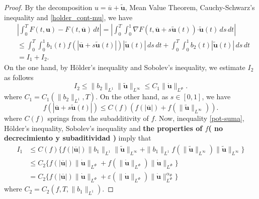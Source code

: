 \documentclass[twoside]{article}
\theoremstyle{remark}
\newcommand{\orlnor}{\|_{L^{\Phi}}}
\renewcommand{\b}[1]{\boldsymbol{#1}}
\newcommand{\ccdot}{\b{\cdot}}
\renewcommand{\leq}{\leqslant}
\begin{document}
\begin{proof}
By the decomposition $u=\overline{u}+\b{\tilde{u}}$,  Mean Value Theorem, Cauchy-Schwarz's inequality 
and \eqref{holder_cont-mu}, we have
\begin{equation}\label{cota-diferencia-F}
\begin{split}
&\left|\int_0^T F(t,\b{u})-F(t,\b{\overline{u}})\,dt\right|=
\left|\int_0^T \int_0^1 \nabla F(t,\b{\overline{u}}+s\b{\tilde{u}}(t))\ccdot \b{\tilde{u}}(t) \,ds \,dt\right|
\\
&\leq \int_0^T \int_0^1 b_1(t)f(|\b{\overline{u}}+s\b{\tilde{u}}(t)|)|\b{\tilde{u}}(t)|\,ds\,dt+
\int_0^T \int_0^1 b_2(t)|\b{\tilde{u}}(t)|\,ds\,dt
\\
&=I_1+I_2.
\end{split}
\end{equation}
On the one hand, by H\"older's inequality and Sobolev's inequality, we estimate $I_2$ as follows
\begin{equation}\label{cota-i2}
I_2\leq \|b_2\|_{L^1} \|\b{\tilde{u}}\|_{L^{\infty}}\leq
C_1\|\b{\dot u}\orlnor.
\end{equation}
 where $C_1=C_1(\|b_2\|_{L^1}, T)$. On the other hand, as $s\in [0,1]$, we have
\begin{equation}\label{pot-suma}
f(|\b{\overline{u}}+s\b{\tilde{u}}(t)|)\leq
C(f)(f(|\b{\overline{u}}|)+f(\|\b{\tilde{u}}\|_{L^{\infty}})).
\end{equation}
where $C(f)$ springs from the subadditivity of $f$. Now,  inequality \eqref{pot-suma}, H\"older's inequality, Sobolev's inequality and {\bf the properties of $f$( no decrecimiento y subaditividad )} imply that
\begin{equation}\label{cota-i1}
\begin{split}
I_1&
\leq C(f)\bigg\{ f(|\b{\overline{u}}|) \|b_1\|_{L^1} \|\b{\tilde{u}}\|_{L^{\infty}}+
 \|b_1\|_{L^1}f(\|\b{\tilde{u}}\|_{L^\infty})\|\b{\tilde{u}}\|_{L^\infty}\bigg\}
\\
&\leq C_2 \bigg\{ f(|\b{\overline{u}}|) \|\b{\dot{u}}\orlnor
+f(\|\b{\dot u}\orlnor) \|\b{\dot u}\orlnor\bigg\}
\\
&=
C_2 \bigg\{ f(|\b{\overline{u}}|) \|\b{\dot{u}}\orlnor
+\varepsilon(\|\b{\dot{u}}\orlnor)\|\b{\dot{u}}\orlnor^{\alpha_{\Phi}}
\bigg\}
\end{split}
\end{equation}
where $C_2=C_2(f,T, \|b_1\|_{L^1} )$. 



\end{proof}
\end{document}
